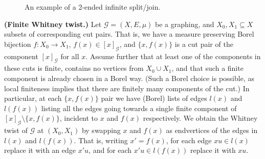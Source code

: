 \documentclass{article}
\theoremstyle{plain}
\theoremstyle{definition}
\newcommand{\cG}{\mathcal{G}}
\begin{document}
\begin{figure}[htb]
{%
}
\caption{An example of a 2-ended infinite split/join.\label{fig:2ended_split}}
\end{figure}

{\bf (Finite Whitney twist.)} Let $\cG=(X,E,\mu)$ be a graphing, and $X_0,X_1 \subseteq X$ subsets of corresponding cut pairs. That is, we have a measure preserving Borel bijection $f:X_0 \to X_1$, $f(x) \in [x]_{\cG}$, and $\{x,f(x)\}$ is a cut pair of the component $[x]_{\cG}$ for all $x$. Assume further that at least one of the components in these cuts is finite, contains no vertices from $X_0 \cup X_1$, and that such a finite component is already chosen in a Borel way. (Such a Borel choice is possible, as local finiteness implies that there are finitely many components of the cut.) In particular, at each $\{x,f(x)\}$ pair we have (Borel) lists of edges $l(x)$ and $l(f(x))$ listing all the edges going towards a single finite component of $[x]_{\cG} \setminus \{x,f(x)\}$, incident to $x$ and $f(x)$ respectively. We obtain the Whitney twist of $\cG$ at $(X_0,X_1)$ by swapping $x$ and $f(x)$ as endvertices of the edges in $l(x)$ and $l(f(x))$. That is, writing $x' = f(x)$, for each edge $xu \in l(x)$ replace it with an edge $x'u$, and for each $x'u \in l(f(x))$ replace it with $xu$.  
\end{document}
